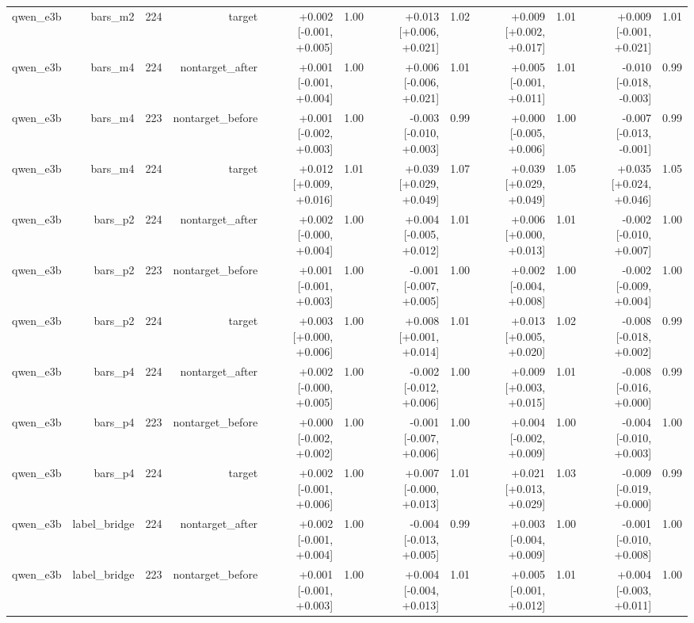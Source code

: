 \begin{table}[t]
\begin{tabular}{lrrrrrrrrrrr}
qwen\_e3b & bars\_m2 & 224 & target & +0.002 [-0.001, +0.005] & 1.00 & +0.013 [+0.006, +0.021] & 1.02 & +0.009 [+0.002, +0.017] & 1.01 & +0.009 [-0.001, +0.021] & 1.01 \\
qwen\_e3b & bars\_m4 & 224 & nontarget\_after & +0.001 [-0.001, +0.004] & 1.00 & +0.006 [-0.006, +0.021] & 1.01 & +0.005 [-0.001, +0.011] & 1.01 & -0.010 [-0.018, -0.003] & 0.99 \\
qwen\_e3b & bars\_m4 & 223 & nontarget\_before & +0.001 [-0.002, +0.003] & 1.00 & -0.003 [-0.010, +0.003] & 0.99 & +0.000 [-0.005, +0.006] & 1.00 & -0.007 [-0.013, -0.001] & 0.99 \\
qwen\_e3b & bars\_m4 & 224 & target & +0.012 [+0.009, +0.016] & 1.01 & +0.039 [+0.029, +0.049] & 1.07 & +0.039 [+0.029, +0.049] & 1.05 & +0.035 [+0.024, +0.046] & 1.05 \\
qwen\_e3b & bars\_p2 & 224 & nontarget\_after & +0.002 [-0.000, +0.004] & 1.00 & +0.004 [-0.005, +0.012] & 1.01 & +0.006 [+0.000, +0.013] & 1.01 & -0.002 [-0.010, +0.007] & 1.00 \\
qwen\_e3b & bars\_p2 & 223 & nontarget\_before & +0.001 [-0.001, +0.003] & 1.00 & -0.001 [-0.007, +0.005] & 1.00 & +0.002 [-0.004, +0.008] & 1.00 & -0.002 [-0.009, +0.004] & 1.00 \\
qwen\_e3b & bars\_p2 & 224 & target & +0.003 [+0.000, +0.006] & 1.00 & +0.008 [+0.001, +0.014] & 1.01 & +0.013 [+0.005, +0.020] & 1.02 & -0.008 [-0.018, +0.002] & 0.99 \\
qwen\_e3b & bars\_p4 & 224 & nontarget\_after & +0.002 [-0.000, +0.005] & 1.00 & -0.002 [-0.012, +0.006] & 1.00 & +0.009 [+0.003, +0.015] & 1.01 & -0.008 [-0.016, +0.000] & 0.99 \\
qwen\_e3b & bars\_p4 & 223 & nontarget\_before & +0.000 [-0.002, +0.002] & 1.00 & -0.001 [-0.007, +0.006] & 1.00 & +0.004 [-0.002, +0.009] & 1.00 & -0.004 [-0.010, +0.003] & 1.00 \\
qwen\_e3b & bars\_p4 & 224 & target & +0.002 [-0.001, +0.006] & 1.00 & +0.007 [-0.000, +0.013] & 1.01 & +0.021 [+0.013, +0.029] & 1.03 & -0.009 [-0.019, +0.000] & 0.99 \\
qwen\_e3b & label\_bridge & 224 & nontarget\_after & +0.002 [-0.001, +0.004] & 1.00 & -0.004 [-0.013, +0.005] & 0.99 & +0.003 [-0.004, +0.009] & 1.00 & -0.001 [-0.010, +0.008] & 1.00 \\
qwen\_e3b & label\_bridge & 223 & nontarget\_before & +0.001 [-0.001, +0.003] & 1.00 & +0.004 [-0.004, +0.013] & 1.01 & +0.005 [-0.001, +0.012] & 1.01 & +0.004 [-0.003, +0.011] & 1.00 \\

\end{tabular}
\end{table}
